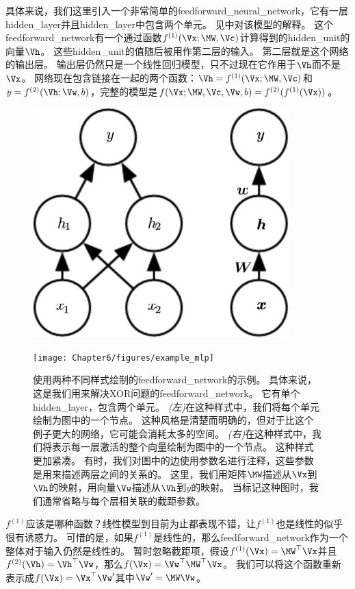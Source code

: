 具体来说，我们这里引入一个非常简单的\gls{feedforward_neural_network}，它有一层\gls{hidden_layer}并且\gls{hidden_layer}中包含两个单元。
见中对该模型的解释。
这个\gls{feedforward_network}有一个通过函数$f^{(1)}(\Vx;\MW, \Vc)$计算得到的\gls{hidden_unit}的向量$\Vh$。
这些\gls{hidden_unit}的值随后被用作第二层的输入。
第二层就是这个网络的输出层。
输出层仍然只是一个线性回归模型，只不过现在它作用于$\Vh$而不是$\Vx$。
网络现在包含链接在一起的两个函数：$\Vh=f^{(1)}(\Vx; \MW, \Vc)$和$y = f^{(2)}(\Vh; \Vw, b)$，完整的模型是$f(\Vx; \MW, \Vc, \Vw, b) = f^{(2)}(f^{(1)}(\Vx))$。
\begin{figure}[!htb]
\ifOpenSource
\centerline{\includegraphics[scale=0.5]{images/44.png}}
\else
\centerline{\texttt{[image: Chapter6/figures/example\_mlp]}}
\fi
\captionsetup{singlelinecheck=off}
\caption{使用两种不同样式绘制的\gls{feedforward_network}的示例。
具体来说，这是我们用来解决XOR问题的\gls{feedforward_network}。
它有单个\gls{hidden_layer}，包含两个单元。
\emph{(左)}在这种样式中，我们将每个单元绘制为图中的一个节点。
这种风格是清楚而明确的，但对于比这个例子更大的网络，它可能会消耗太多的空间。
\emph{(右)}在这种样式中，我们将表示每一层激活的整个向量绘制为图中的一个节点。
这种样式更加紧凑。
有时，我们对图中的边使用参数名进行注释，这些参数是用来描述两层之间的关系的。
这里，我们用矩阵$\MW$描述从$\Vx$到$\Vh$的映射，用向量$\Vw$描述从$\Vh$到$y$的映射。
当标记这种图时，我们通常省略与每个层相关联的截距参数。}
\label{fig:chap6_example_mlp}
\end{figure}


$f^{(1)}$应该是哪种函数？线性模型到目前为止都表现不错，让$f^{(1)}$也是线性的似乎很有诱惑力。
可惜的是，如果$f^{(1)}$是线性的，那么\gls{feedforward_network}作为一个整体对于输入仍然是线性的。
暂时忽略截距项，假设$f^{(1)}(\Vx)= \MW^\top \Vx$并且$f^{(2)}(\Vh)=\Vh^\top \Vw$，那么$f(\Vx) = \Vw^\top\MW^\top \Vx$。
我们可以将这个函数重新表示成$f(\Vx) = \Vx^\top\Vw'$其中$\Vw' = \MW\Vw$。

